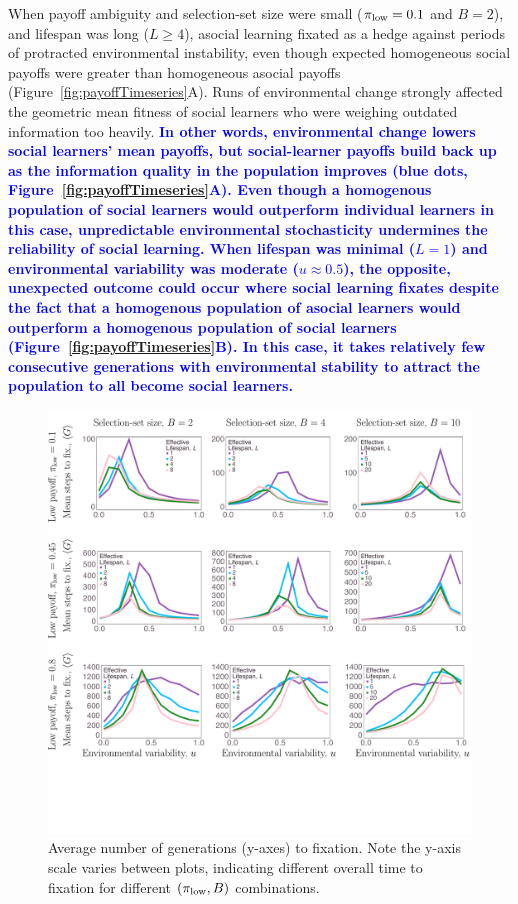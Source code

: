 \documentclass[letterpaper,11.5pt]{scrartcl}
\newcommand{\edit}[1]{{\bfseries \textcolor{blue} {#1}}}
\begin{document}
When payoff ambiguity and selection-set size were small ($\pi_{\mathrm{low}}=0.1$ and $B=2$), and lifespan was long ($L \geq 4$), asocial learning fixated as a hedge against periods of protracted environmental instability, even though expected
homogeneous social payoffs were greater than homogeneous asocial payoffs (Figure~\ref{fig:payoffTimeseries}A). Runs of environmental change strongly affected the geometric mean fitness of social learners who were weighing
outdated information too heavily. \edit{In other words, environmental change lowers social learners' mean payoffs, but social-learner payoffs build back up as the information quality in the population improves (blue dots, Figure~\ref{fig:payoffTimeseries}A).  Even though a homogenous population of social learners would outperform individual learners in this case, unpredictable environmental stochasticity undermines the reliability of social learning.  When lifespan was minimal ($L=1$) and environmental variability was moderate ($u\approx0.5$), the opposite, unexpected outcome could occur where social learning fixates despite the fact that a homogenous population of asocial learners would outperform a homogenous population of social learners (Figure~\ref{fig:payoffTimeseries}B). In this case, it takes relatively few consecutive generations with environmental stability to attract the population to all become social learners.}

\begin{figure}
  \caption{Average number of generations (y-axes) to fixation. 
    Note the y-axis scale varies between plots, indicating different overall 
    time to fixation for different $(\pi_{\mathrm{low}}, B)$ combinations.} 
  \label{fig:steps}
\centering
    \includegraphics[width=\textwidth]{Figures/stepResultsPlots.pdf}
\end{figure}
\end{document}
